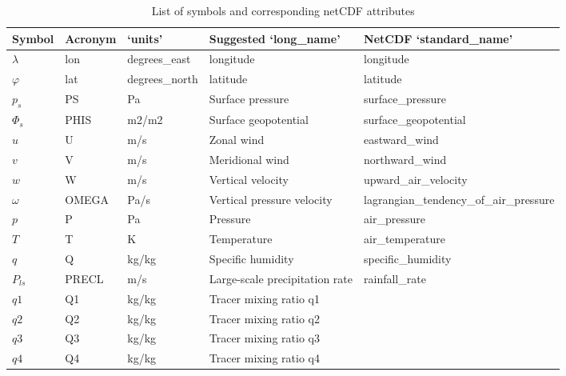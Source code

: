 \documentclass[times,doublespace]{fldauth}
\begin{document}
{\begin{appendix}
\begin{table}[h]
\caption{List of symbols and corresponding netCDF attributes} \label{tab:netcdf}
\begin{tabular*}{\textwidth}{@{\extracolsep{\fill}}lllll}
\hline Symbol & Acronym & `units' & Suggested `long\_name'  & NetCDF `standard\_name' \\ \hline 
$\lambda$ & lon & degrees\_east & longitude & longitude \\
$\varphi$ & lat & degrees\_north & latitude & latitude \\
$p_s$ & PS & Pa & Surface pressure & surface\_pressure\\
$\Phi_s$ & PHIS & m2/m2 &  Surface geopotential & surface\_geopotential\\
$u$ & U & m/s &  Zonal wind & eastward\_wind \\
$v$ & V & m/s & Meridional wind & northward\_wind\\
$w$ & W & m/s & Vertical velocity & upward\_air\_velocity\\
$\omega$ & OMEGA & Pa/s & Vertical pressure velocity & lagrangian\_tendency\_of\_air\_pressure \\
$p$ & P & Pa & Pressure & air\_pressure\\
$T$ & T & K & Temperature & air\_temperature\\
$q$ & Q & kg/kg & Specific humidity & specific\_humidity\\
$P_{ls}$ & PRECL & m/s & Large-scale precipitation rate & rainfall\_rate\\
$q1$ & Q1 & kg/kg & Tracer mixing ratio q1 & \\
$q2$ & Q2 & kg/kg & Tracer mixing ratio q2 & \\
$q3$ & Q3 & kg/kg & Tracer mixing ratio q3 & \\
$q4$ & Q4 & kg/kg & Tracer mixing ratio q4 & \\
\hline 
\end{tabular*}
\end{table}


\end{appendix}}
\end{document}
